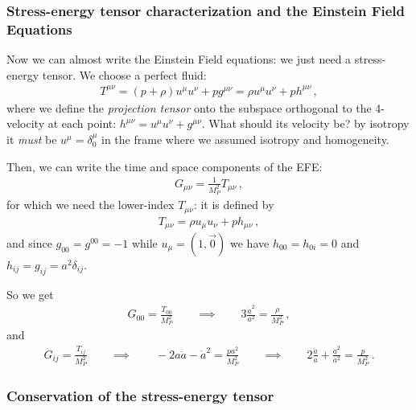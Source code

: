 \documentclass[main.tex]{subfiles}
\begin{document}
\subsubsection{Stress-energy tensor characterization and the Einstein Field Equations}

Now we can almost write the Einstein Field equations: we just need a stress-energy tensor. We choose a perfect fluid: 
%
\begin{align}
T^{\mu \nu } = (p + \rho ) u^{\mu } u^{\nu } + p g^{\mu \nu } = \rho u^{\mu } u^{\nu } + p h^{\mu \nu }
\,,
\end{align}
%
where we define the \emph{projection tensor} onto the subspace orthogonal to the 4-velocity at each point: \(h^{\mu \nu } = u^{\mu } u^{\nu } + g^{\mu \nu }\). 
What should its velocity be? 
by isotropy it \emph{must} be \(u^{\mu } = \delta^{\mu }_{0}\) in the frame where we assumed isotropy and homogeneity.

Then, we can write the time and space components of the EFE: 
%
\begin{align}
G_{\mu \nu } = \frac{1}{M_P^2} T_{\mu \nu }
\,,
\end{align}
%
for which we need the lower-index \(T_{\mu \nu }\): it is defined by 
%
\begin{align}
T_{\mu \nu } = \rho u_{\mu} u_{\nu } + p h_{\mu \nu }
\,,
\end{align}
%
and since \(g_{00} = g^{00 } = -1\) while \(u_{\mu } = (1, \vec{0})\) we have \(h_{00} = h_{0i} =  0\) and \(h_{ij} = g_{ij} =  a^2 \delta_{ij}\).

So we get 
%
\begin{align}
G_{00} = \frac{T_{00} }{M_P^2}
\qquad \implies \qquad
3 \frac{\dot{a}^2}{a^2} = \frac{\rho}{M_P^2}
\,,
\end{align}
%
and 
%
\begin{align}
G_{ij} = \frac{T_{ij}}{M_P^2}
\qquad \implies \qquad
-2 a \ddot{a} - \dot{a}^2 = \frac{p a^2}{M_P^2}
\qquad \implies \qquad
2 \frac{\ddot{a}}{a} + \frac{\dot{a}^2}{a^2} = \frac{p}{M_P^2}
\,.
\end{align}

\subsubsection{Conservation of the stress-energy tensor}
\end{document}
